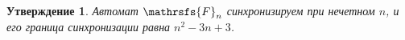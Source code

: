 \documentclass[11pt]{article}
\newtheorem{theorem}{Утверждение}
\begin{document}
%
%

\begin{theorem}
Автомат $\mathrsfs{F}_n$ синхронизируем при нечетном $n$, и его граница синхронизации равна $n^2 - 3n + 3$.
\end{theorem}
\end{document}
